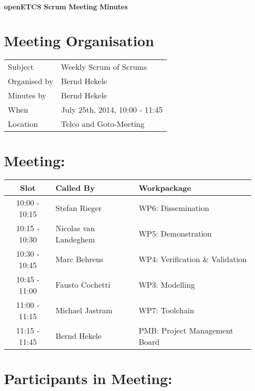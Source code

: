 \documentclass[a4paper, 11pt]{article}
\begin{document}
{\begin{center}\huge\bf openETCS Scrum Meeting Minutes\end{center}}
\section{Meeting Organisation}

\renewcommand{\arraystretch}{1.5}
\begin{supertabular}{m{.2\textwidth}m{.8\textwidth}}
Subject & Weekly Scrum of Scrums\\
Organised by & Bernd Hekele\\
Minutes by & Bernd Hekele\\
When & July 25th, 2014, 10:00 - 11:45\\
Location & Telco and Goto-Meeting\\
\end{supertabular}

\renewcommand{\arraystretch}{1.0}
\section{Meeting:}

\begin{tabular}{|c|l|l|}
\hline
\textbf{Slot} &  \textbf{Called By} & \textbf{Workpackage} \\
\hline  
10:00 - 10:15 & Stefan Rieger & WP6: Dissemination \\\hline  
10:15 - 10:30 & Nicolas van Landeghem & WP5: Demonstration \\\hline  
10:30 - 10:45 & Marc Behrens & WP4: Verification \& Validation \\\hline  
10:45 - 11:00 & Fausto Cochetti & WP3: Modelling \\\hline  
11:00 - 11:15 & Michael Jastram & WP7: Toolchain \\\hline
11:15 - 11:45 & Bernd Hekele & PMB: Project Management Board \\\hline  
\end{tabular}

\section{Participants in Meeting:}
\end{document}
